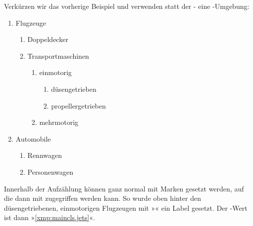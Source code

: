     \begin{Example}
      Verkürzen wir das vorherige Beispiel und verwenden statt der
      - eine
      -Umgebung:
      \begin{ShowOutput}[\baselineskip]
        \begin{enumerate}
        \item Flugzeuge
          \begin{enumerate}
          \item Doppeldecker
          \item Transportmaschinen
            \begin{enumerate}
            \item einmotorig
              \begin{enumerate}
              \item{düsengetrieben}\label{xmp:maincls.jets}
              \item{propellergetrieben}
              \end{enumerate}
            \item mehrmotorig
            \end{enumerate}
          \end{enumerate}
        \item Automobile
          \begin{enumerate}
          \item Rennwagen
          \item Personenwagen
          \end{enumerate}
        \end{enumerate}
      \end{ShowOutput}
      Innerhalb der Aufzählung können ganz normal mit  Marken
      gesetzt werden, auf die dann mit  zugegriffen werden
      kann. So wurde oben hinter den düsengetriebenen, einmotorigen
      Flugzeugen mit »« ein Label
      gesetzt. Der -Wert ist dann »\ref*{xmp:maincls.jets}«.
    \end{Example}%
    \ExampleEndFix
  \fi
  \EndIndexGroup
  

